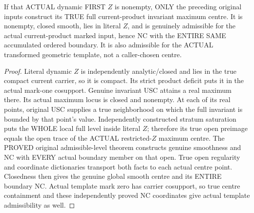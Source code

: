 \begin{theorem}
\label{hir:sharp-original-actual-dynamic-distinct-max-centre}
\leanok
If that ACTUAL dynamic FIRST $Z$ is nonempty, ONLY the preceding original
inputs construct its TRUE full current-product invariant maximum centre.
It is nonempty, closed smooth, lies in literal $Z$, and is genuinely
admissible for the actual current-product marked input, hence NC with the
ENTIRE SAME accumulated ordered boundary. It is also admissible for the
ACTUAL transformed geometric template, not a caller-chosen centre.
\end{theorem}
\begin{proof}
Literal dynamic $Z$ is independently analytic/closed and lies in the true
compact current carrier, so it is compact. Its strict product deficit puts
it in the actual mark-one cosupport. Genuine invariant USC attains a real
maximum there. Its actual maximum locus is closed and nonempty. At each
of its real points, original USC supplies a true neighborhood on which the
full invariant is bounded by that point's value. Independently constructed
stratum saturation puts the WHOLE local full level inside literal $Z$;
therefore its true open preimage equals the open trace of the ACTUAL
restricted-$Z$ maximum centre. The PROVED original admissible-level theorem
constructs genuine smoothness and NC with EVERY actual boundary member
on that open. True open regularity and coordinate dictionaries transport
both facts to each actual centre point. Closedness then gives the genuine
global smooth centre and its ENTIRE boundary NC. Actual template mark zero
has carrier cosupport, so true centre containment and these independently
proved NC coordinates give actual template admissibility as well.
\end{proof}


